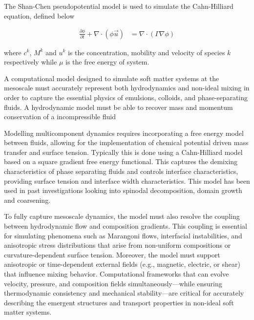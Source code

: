 The Shan-Chen pseudopotential
model is used to simulate the Cahn-Hilliard equation, defined below

\begin{equation}
    \begin{split}
    \frac{\partial\phi}{\partial t}+\nabla\cdot\left(\phi\vec{u}\right) &= \nabla \cdot \left( \Gamma  \nabla\phi \right)
    \end{split}
\end{equation}

where $c^k$, $M^k$ and $u^k$ is the concentration, mobility and velocity of species $k$ respectively while $\mu$ is the free energy of system. 
\cite{shan_lattice_1993, shan_simulation_1994, he_lattice_1997, he_discrete_1998}



A computational model designed to simulate soft matter systems 
at the mesoscale must accurately represent both hydrodynamics and non-ideal mixing in order to capture the essential physics of emulsions, colloids, and phase-separating fluids. 
A hydrodynamic model must be able to recover mass and momentum conservation of a incompressible fluid

Modelling multicomponent dynamics requires incorporating a free energy model between fluids, allowing for the implementation of
chemical potential driven mass transfer and surface tension. Typically this is done using a Cahn-Hilliard model based on a
square gradient free energy functional. This captures the demixing characteristics of phase separating fluids and controls interface
characteristics, providing surface tension and interface width characteristics. This model has been used in past investigations looking 
into spinodal decomposition, domain growth and coarsening. 


To fully capture mesoscale dynamics, the model must also resolve the coupling between hydrodynamic flow and composition gradients. This coupling 
is essential for simulating phenomena such as Marangoni flows, interfacial instabilities, and anisotropic stress distributions that arise from 
non-uniform compositions or curvature-dependent surface tension. Moreover, the model must support anisotropic or time-dependent external fields 
(e.g., magnetic, electric, or shear) that influence mixing behavior. Computational frameworks that can evolve velocity, pressure, and composition 
fields simultaneously—while ensuring thermodynamic consistency and mechanical stability—are critical for accurately describing the emergent structures 
and transport properties in non-ideal soft matter systems.

